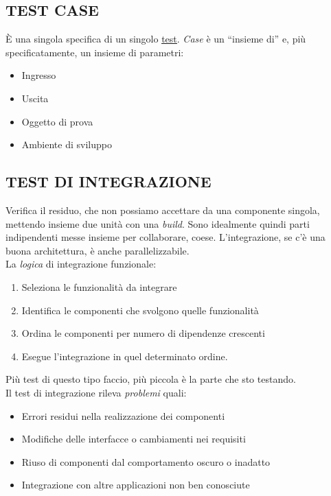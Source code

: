 		\subsection{TEST CASE}		\label{testcase}
		È una singola specifica di un singolo \underline{\hyperref[test]{test}}. \textit{Case} è un ``insieme di'' e, più specificatamente, un insieme di parametri:
		\begin{itemize}
			\item Ingresso
			\item Uscita
			\item Oggetto di prova
			\item Ambiente di sviluppo
		\end{itemize}


		\subsection{TEST DI INTEGRAZIONE}	 \label{testintegrazione}
		Verifica il residuo, che non possiamo accettare da una componente singola, mettendo insieme due unità con una \textit{build}.
		Sono idealmente quindi parti indipendenti messe insieme per collaborare, coese.
		L'integrazione, se c'è una buona architettura, è anche parallelizzabile. \\
		La \textit{logica} di integrazione funzionale:
		\begin{enumerate}
			\item Seleziona le funzionalità da integrare
			\item Identifica le componenti che svolgono quelle funzionalità
			\item Ordina le componenti per numero di dipendenze crescenti
			\item Esegue l'integrazione in quel determinato ordine.
		\end{enumerate}
		Più test di questo tipo faccio, più piccola è la parte che sto testando. \\
		Il test di integrazione rileva \textit{problemi} quali:
		\begin{itemize}
			\item Errori residui nella realizzazione dei componenti
			\item Modifiche delle interfacce o cambiamenti nei requisiti
			\item Riuso di componenti dal comportamento oscuro o inadatto
			\item Integrazione con altre applicazioni non ben conosciute
		\end{itemize}

